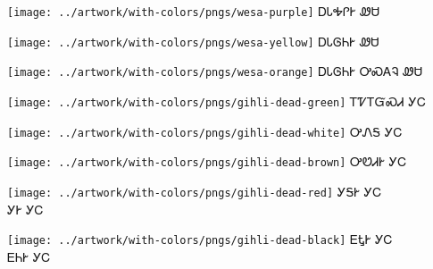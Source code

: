 \documentclass[avery5371]{flashcards}%
\begin{document}
    \begin{flashcard}{
        \texttt{[image: ../artwork/with-colors/pngs/wesa-purple]}
    }
        \Huge ᎠᏓᎭᎵᎨ ᏪᏌ
    \end{flashcard}

    \begin{flashcard}{
        \texttt{[image: ../artwork/with-colors/pngs/wesa-yellow]}
    }
        \Huge ᎠᏓᎶᏂᎨ ᏪᏌ
    \end{flashcard}

    \begin{flashcard}{
        \texttt{[image: ../artwork/with-colors/pngs/wesa-orange]}
    }
        \Huge ᎠᏓᎶᏂᎨ ᎤᏍᎪᎸ ᏪᏌ
    \end{flashcard}

    \begin{flashcard}{
        \texttt{[image: ../artwork/with-colors/pngs/gihli-dead-green]}
    }
        \Huge ᎢᏤᎢᏳᏍᏗ ᎩᏟ
    \end{flashcard}

    \begin{flashcard}{
        \texttt{[image: ../artwork/with-colors/pngs/gihli-dead-white]}
    }
        \Huge ᎤᏁᎦ ᎩᏟ
    \end{flashcard}

    \begin{flashcard}{
        \texttt{[image: ../artwork/with-colors/pngs/gihli-dead-brown]}
    }
        \Huge ᎤᏬᏗᎨ ᎩᏟ
    \end{flashcard}

    \begin{flashcard}{
        \texttt{[image: ../artwork/with-colors/pngs/gihli-dead-red]}
    }
        \Huge ᎩᎦᎨ ᎩᏟ\\ᎩᎨ ᎩᏟ
    \end{flashcard}

    \begin{flashcard}{
        \texttt{[image: ../artwork/with-colors/pngs/gihli-dead-black]}
    }
        \Huge ᎬᎿᎨ ᎩᏟ\\ᎬᏂᎨ ᎩᏟ
    \end{flashcard}
\end{document}
